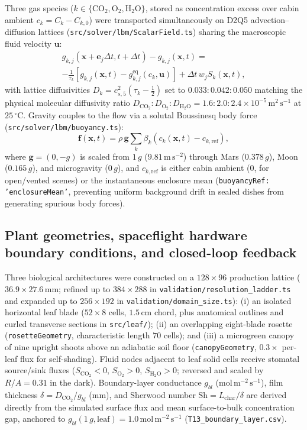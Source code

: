 \documentclass[final,5p,times,twocolumn,numbers,sort&compress]{elsarticle}
\newcommand{\mseu}{\ensuremath{\mathrm{m^{2}\,s^{-1}}}}
\newcommand{\molms}{\ensuremath{\mathrm{mol\,m^{-2}\,s^{-1}}}}
\newcommand{\msq}{\ensuremath{\mathrm{m\,s^{-2}}}}
\begin{document}
Three gas species ($k \in \{\mathrm{CO_2}, \mathrm{O_2}, \mathrm{H_2O}\}$, stored as concentration excess over cabin ambient $c_k = C_k - C_{k,0}$) were transported simultaneously on D2Q5 advection--diffusion lattices (\texttt{src/solver/lbm/ScalarField.ts}) sharing the macroscopic fluid velocity $\mathbf{u}$:
\begin{multline}
g_{k,j}(\mathbf{x}+\mathbf{e}_j\Delta t, t+\Delta t) - g_{k,j}(\mathbf{x},t) = \\
-\frac{1}{\tau_k}\left[g_{k,j}(\mathbf{x},t) - g_{k,j}^{\mathrm{eq}}(c_k,\mathbf{u})\right] + \Delta t\,w_j S_k(\mathbf{x},t),
\label{eq:lbm_d2q5}
\end{multline}
with lattice diffusivities $D_k = c_{s,5}^2(\tau_k - \tfrac{1}{2})$ set to $0.033 : 0.042 : 0.050$ matching the physical molecular diffusivity ratio $D_{\mathrm{CO_2}} : D_{\mathrm{O_2}} : D_{\mathrm{H_2O}} = 1.6 : 2.0 : 2.4 \times 10^{-5}\,\mseu$ at $25\,^\circ\mathrm{C}$. Gravity couples to the flow via a solutal Boussinesq body force (\texttt{src/solver/lbm/buoyancy.ts}):
\begin{equation}
\mathbf{f}(\mathbf{x},t) = \rho\,\mathbf{g}\sum_k \beta_k\left(c_k(\mathbf{x},t) - c_{k,\mathrm{ref}}\right),
\label{eq:boussinesq}
\end{equation}
where $\mathbf{g} = (0, -g)$ is scaled from $1\,g$ ($9.81\,\msq$) through Mars ($0.378\,g$), Moon ($0.165\,g$), and microgravity ($0\,g$), and $c_{k,\mathrm{ref}}$ is either cabin ambient ($0$, for open/vented scenes) or the instantaneous enclosure mean (\texttt{buoyancyRef: 'enclosureMean'}, preventing uniform background drift in sealed dishes from generating spurious body forces).

\subsection{Plant geometries, spaceflight hardware boundary conditions, and closed-loop feedback}

Three biological architectures were constructed on a $128\times 96$ production lattice ($36.9\times 27.6\,\mathrm{mm}$; refined up to $384\times 288$ in \texttt{validation/resolution\_ladder.ts} and expanded up to $256\times 192$ in \texttt{validation/domain\_size.ts}): (i) an isolated horizontal leaf blade ($52\times 8$ cells, $1.5\,\mathrm{cm}$ chord, plus anatomical outlines and curled transverse sections in \texttt{src/leaf/}); (ii) an overlapping eight-blade rosette (\texttt{rosetteGeometry}, characteristic length $70$ cells); and (iii) a microgreen canopy of nine upright shoots above an adiabatic soil floor (\texttt{canopyGeometry}, $0.3\times$ per-leaf flux for self-shading). Fluid nodes adjacent to leaf solid cells receive stomatal source/sink fluxes ($S_{\mathrm{CO_2}} < 0$, $S_{\mathrm{O_2}} > 0$, $S_{\mathrm{H_2O}} > 0$; reversed and scaled by $R/A = 0.31$ in the dark). Boundary-layer conductance $g_{bl}$ ($\molms$), film thickness $\delta = D_{\mathrm{CO_2}}/g_{bl}$ ($\mathrm{mm}$), and Sherwood number $\mathrm{Sh} = L_{\text{char}}/\delta$ are derived directly from the simulated surface flux and mean surface-to-bulk concentration gap, anchored to $g_{bl}(1\,g,\text{leaf}) = 1.0\,\molms$ (\texttt{T13\_boundary\_layer.csv}).
\end{document}
